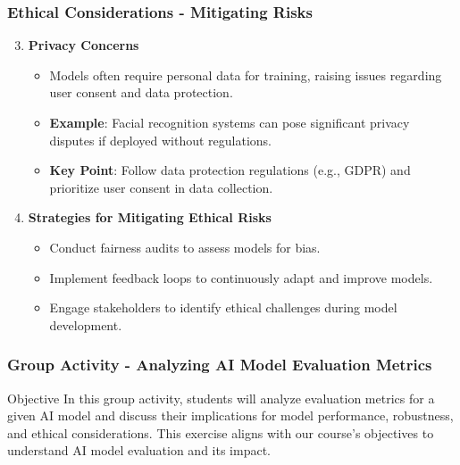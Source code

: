 \documentclass[aspectratio=169]{beamer}
\begin{document}
\begin{frame}[fragile]
    \frametitle{Ethical Considerations - Mitigating Risks}
    \begin{enumerate}
        \setcounter{enumi}{2}
        \item \textbf{Privacy Concerns}
            \begin{itemize}
                \item Models often require personal data for training, raising issues regarding user consent and data protection.
                \item \textbf{Example}: Facial recognition systems can pose significant privacy disputes if deployed without regulations.
                \item \textbf{Key Point}: Follow data protection regulations (e.g., GDPR) and prioritize user consent in data collection.
            \end{itemize}
        
        \item \textbf{Strategies for Mitigating Ethical Risks}
            \begin{itemize}
                \item Conduct fairness audits to assess models for bias.
                \item Implement feedback loops to continuously adapt and improve models.
                \item Engage stakeholders to identify ethical challenges during model development.
            \end{itemize}
    \end{enumerate}
\end{frame}

\begin{frame}[fragile]
    \frametitle{Group Activity - Analyzing AI Model Evaluation Metrics}
    \begin{block}{Objective}
        In this group activity, students will analyze evaluation metrics for a given AI model and discuss their implications for model performance, robustness, and ethical considerations. This exercise aligns with our course’s objectives to understand AI model evaluation and its impact.
    \end{block}
\end{frame}
\end{document}
